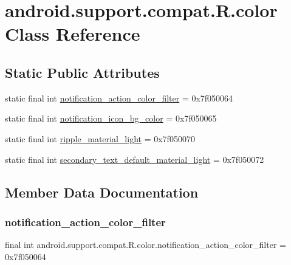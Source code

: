 \hypertarget{classandroid_1_1support_1_1compat_1_1R_1_1color}{}\section{android.\+support.\+compat.\+R.\+color Class Reference}
\label{classandroid_1_1support_1_1compat_1_1R_1_1color}
\subsection*{Static Public Attributes}
\begin{DoxyCompactItemize}
\item 
static final int \mbox{\hyperlink{classandroid_1_1support_1_1compat_1_1R_1_1color_a9d17db1ac8d9019703d6eb308d2618bc}{notification\+\_\+action\+\_\+color\+\_\+filter}} = 0x7f050064
\item 
static final int \mbox{\hyperlink{classandroid_1_1support_1_1compat_1_1R_1_1color_aa6943b5b8f0e0a0a86e7434f741f18f0}{notification\+\_\+icon\+\_\+bg\+\_\+color}} = 0x7f050065
\item 
static final int \mbox{\hyperlink{classandroid_1_1support_1_1compat_1_1R_1_1color_a9963bd6162040fda401e2439613f89c4}{ripple\+\_\+material\+\_\+light}} = 0x7f050070
\item 
static final int \mbox{\hyperlink{classandroid_1_1support_1_1compat_1_1R_1_1color_ab34b571512153e84b130cbc074e1271a}{secondary\+\_\+text\+\_\+default\+\_\+material\+\_\+light}} = 0x7f050072
\end{DoxyCompactItemize}


\subsection{Member Data Documentation}
\mbox{\label{classandroid_1_1support_1_1compat_1_1R_1_1color_a9d17db1ac8d9019703d6eb308d2618bc}} 
\subsubsection{\texorpdfstring{notification\+\_\+action\+\_\+color\+\_\+filter}{notification\_action\_color\_filter}}
{\footnotesize\ttfamily final int android.\+support.\+compat.\+R.\+color.\+notification\+\_\+action\+\_\+color\+\_\+filter = 0x7f050064\hspace{0.3cm}{\ttfamily [static]}}

